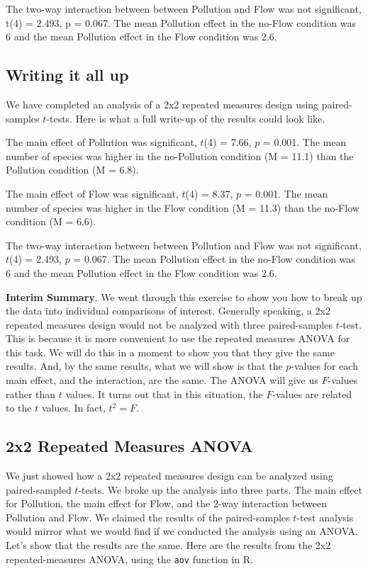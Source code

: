 \documentclass[
  letterpaper,
  DIV=11,
  numbers=noendperiod]{scrreprt}
\begin{document}
The two-way interaction between between Pollution and Flow was not
significant, t(4) = 2.493, p = 0.067. The mean Pollution effect in the
no-Flow condition was 6 and the mean Pollution effect in the Flow
condition was 2.6.

\subsection{Writing it all up}\label{writing-it-all-up}

We have completed an analysis of a 2x2 repeated measures design using
paired-samples \(t\)-tests. Here is what a full write-up of the results
could look like.

The main effect of Pollution was significant, \(t\)(4) = 7.66, \(p\) =
0.001. The mean number of species was higher in the no-Pollution
condition (M = 11.1) than the Pollution condition (M = 6.8).

The main effect of Flow was significant, \(t\)(4) = 8.37, \(p\) = 0.001.
The mean number of species was higher in the Flow condition (M = 11.3)
than the no-Flow condition (M = 6.6).

The two-way interaction between between Pollution and Flow was not
significant, \(t\)(4) = 2.493, \(p\) = 0.067. The mean Pollution effect
in the no-Flow condition was 6 and the mean Pollution effect in the Flow
condition was 2.6.

\textbf{Interim Summary}. We went through this exercise to show you how
to break up the data into individual comparisons of interest. Generally
speaking, a 2x2 repeated measures design would not be analyzed with
three paired-samples \(t\)-test. This is because it is more convenient
to use the repeated measures ANOVA for this task. We will do this in a
moment to show you that they give the same results. And, by the same
results, what we will show is that the \(p\)-values for each main
effect, and the interaction, are the same. The ANOVA will give us
\(F\)-values rather than \(t\) values. It turns out that in this
situation, the \(F\)-values are related to the \(t\) values. In fact,
\(t^2 = F\).

\subsection{2x2 Repeated Measures
ANOVA}\label{x2-repeated-measures-anova}

We just showed how a 2x2 repeated measures design can be analyzed using
paired-sampled \(t\)-tests. We broke up the analysis into three parts.
The main effect for Pollution, the main effect for Flow, and the 2-way
interaction between Pollution and Flow. We claimed the results of the
paired-samples \(t\)-test analysis would mirror what we would find if we
conducted the analysis using an ANOVA. Let's show that the results are
the same. Here are the results from the 2x2 repeated-measures ANOVA,
using the \texttt{aov} function in R.
\end{document}
